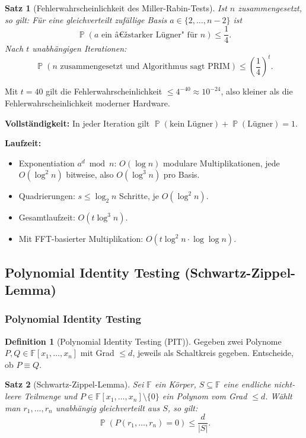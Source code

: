 ﻿\documentclass[12pt,a4paper]{article}
\theoremstyle{definition}
\newtheorem{definition}{Definition}[section]
\theoremstyle{plain}
\newtheorem{satz}{Satz}[section]
\theoremstyle{remark}
\DeclareMathOperator{\Prob}{\mathbb{P}}
\begin{document}
\begin{satz}[Fehlerwahrscheinlichkeit des Miller-Rabin-Tests]\label{satz:mrfehler}
  Ist $n$ zusammengesetzt, so gilt: Für eine gleichverteilt zufällige
  Basis $a \in \{2, \ldots, n-2\}$ ist
  \[
    \Prob\!\left(\text{$a$ ein â€žstarker Lügner" für $n$}\right)
    \leq \frac{1}{4}.
  \]
  Nach $t$ unabhängigen Iterationen:
  \[
    \Prob\!\left(\text{$n$ zusammengesetzt und Algorithmus sagt PRIM}\right)
    \leq \left(\frac{1}{4}\right)^{\!t}.
  \]
\end{satz}

Mit $t = 40$ gilt die Fehlerwahrscheinlichkeit $\leq 4^{-40} \approx 10^{-24}$,
also kleiner als die Fehlerwahrscheinlichkeit moderner Hardware.

\textbf{Vollständigkeit:} In jeder Iteration gilt
$\Prob(\text{kein Lügner}) + \Prob(\text{Lügner}) = 1$.

\textbf{Laufzeit:}
\begin{itemize}
  \item Exponentiation $a^d \bmod n$: $O(\log n)$ modulare Multiplikationen,
    jede $O(\log^2 n)$ bitweise, also $O(\log^3 n)$ pro Basis.
  \item Quadrierungen: $s \leq \log_2 n$ Schritte, je $O(\log^2 n)$.
  \item Gesamtlaufzeit: $O(t \log^3 n)$.
  \item Mit FFT-basierter Multiplikation: $O(t \log^2 n \cdot \log\log n)$.
\end{itemize}

\subsection{Polynomial Identity Testing (Schwartz-Zippel-Lemma)}
\label{subsec:schwartz}

\subsubsection{Polynomial Identity Testing}

\begin{definition}[Polynomial Identity Testing (PIT)]\label{def:pit}
  Gegeben zwei Polynome $P, Q \in \mathbb{F}[x_1, \ldots, x_n]$ mit Grad
  $\leq d$, jeweils als Schaltkreis gegeben. Entscheide, ob $P \equiv Q$.
\end{definition}

\begin{satz}[Schwartz-Zippel-Lemma]\label{satz:sz}
  Sei $\mathbb{F}$ ein Körper, $S \subseteq \mathbb{F}$ eine endliche
  nicht-leere Teilmenge und $P \in \mathbb{F}[x_1,\ldots,x_n]\setminus\{0\}$
  ein Polynom vom Grad $\leq d$. Wählt man $r_1, \ldots, r_n$ unabhängig
  gleichverteilt aus $S$, so gilt:
  \[
    \Prob(P(r_1, \ldots, r_n) = 0) \leq \frac{d}{|S|}.
  \]
\end{satz}
\end{document}
